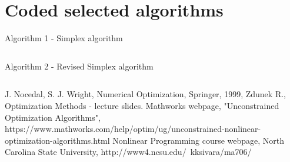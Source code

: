\documentclass[eng,openany]{mgr}
\begin{document}
\section{Coded selected algorithms}
Algorithm 1 - Simplex algorithm\\ 
\begin{lstlisting}

\end{lstlisting}
\newpage
Algorithm 2 - Revised Simplex algorithm\\
\begin{lstlisting}

\end{lstlisting}
\begin{thebibliography}{8}
J. Nocedal, S. J. Wright, Numerical Optimization, Springer, 1999,
Zdunek R., Optimization Methods - lecture slides.
Mathworks webpage, "Unconstrained Optimization Algorithms", https://www.mathworks.com/help/optim/ug/unconstrained-nonlinear-optimization-algorithms.html
Nonlinear Programming course webpage, North Carolina State University,
http://www4.ncsu.edu/~kksivara/ma706/
\end{thebibliography}
\end{document}
